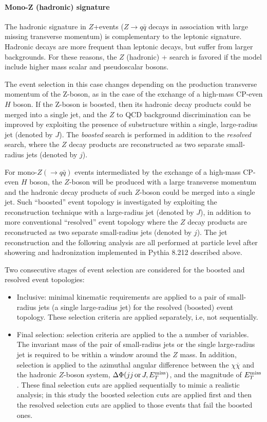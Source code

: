 \paragraph{Mono-Z (hadronic) signature}

The hadronic signature in $Z$+\MET events ($Z \to q\bar{q}$ decays in association with large missing transverse momentum) is complementary to the leptonic signature. 
Hadronic decays are more frequent than leptonic decays, but suffer from larger backgrounds. 
For these reasons, the $Z$ (hadronic) + \MET search is favored if the model include higher mass scalar and pseudoscalar bosons. 

The event selection in this case changes depending on the production transverse momentum of the Z-boson, as in the case of the exchange of a high-mass CP-even $H$ boson. 
If the Z-boson is boosted, then its hadronic decay products could be merged into a single jet, and the $Z$ to QCD background discrimination can be improved by exploiting the presence of substructure within a single, large-radius jet (denoted by $J$). 
The \textit{boosted} search is performed in addition to the \textit{resolved} search, where the $Z$ decay products are reconstructed as two separate small-radius jets (denoted by $j$).

For mono-$Z (\to q\bar{q})$ events intermediated by the exchange of a high-mass CP-even $H$ boson, the $Z$-boson will be produced with a large transverse momentum and the hadronic decay products of such $Z$-boson could be merged into a single jet. 
Such ``boosted'' event topology is investigated by exploiting the reconstruction technique with a large-radius jet (denoted by $J$), in addition to more conventional ``resolved'' event topology where the $Z$ decay products are reconstructed as two separate small-radius jets (denoted by $j$). 
The jet reconstruction and the following analysis are all performed at particle level after showering and hadronization implemented in Pythia 8.212 described above.

Two consecutive stages of event selection are considered for the boosted and resolved event topologies:
\begin{itemize}
\item Inclusive: minimal kinematic requirements are applied to a pair of small-radius jets (a single large-radius jet) for the resolved (boosted) event topology. 
These selection criteria are applied separately, i.e, not sequentially.
\item Final selection: selection criteria are applied to the a number of variables. 
The invariant mass of the pair of small-radius jets or the single large-radius jet is required to be within a window around the $Z$ mass. 
In addition, selection is applied to the azimuthal angular difference between the $\chi\overline{\chi}$ and the hadronic $Z$-boson system, $\Delta\Phi(jj {\,\text{or}\,} J, E_T^\mathrm{miss})$, and the magnitude of $E_T^\mathrm{miss}$.
These final selection cuts are applied sequentially to mimic a realistic analysis; in this study the boosted selection cuts are applied first and then the resolved selection cuts are applied to those events that fail the boosted ones.
\end{itemize}

